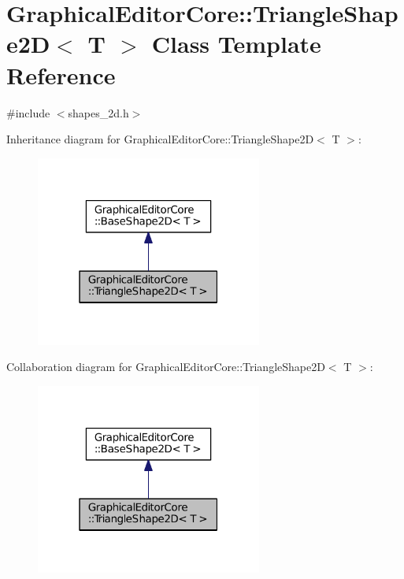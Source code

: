 \hypertarget{classGraphicalEditorCore_1_1TriangleShape2D}{}\section{Graphical\+Editor\+Core\+:\+:Triangle\+Shape2D$<$ T $>$ Class Template Reference}
\label{classGraphicalEditorCore_1_1TriangleShape2D}


{\ttfamily \#include $<$shapes\+\_\+2d.\+h$>$}



Inheritance diagram for Graphical\+Editor\+Core\+:\+:Triangle\+Shape2D$<$ T $>$\+:
\nopagebreak
\begin{figure}[H]
\begin{center}
\leavevmode
\includegraphics[width=211pt]{classGraphicalEditorCore_1_1TriangleShape2D__inherit__graph}
\end{center}
\end{figure}


Collaboration diagram for Graphical\+Editor\+Core\+:\+:Triangle\+Shape2D$<$ T $>$\+:
\nopagebreak
\begin{figure}[H]
\begin{center}
\leavevmode
\includegraphics[width=211pt]{classGraphicalEditorCore_1_1TriangleShape2D__coll__graph}
\end{center}
\end{figure}
